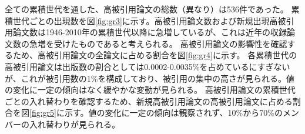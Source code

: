 全ての累積世代を通した、高被引用論文の総数（異なり）は536件であった。
累積世代ごとの出現数を図\ref{fig:gr3}に示す。高被引用論文数および新規出現高被引用論文数は1946-2010年の累積世代以降に急増しているが、これは近年の収録論文数の急増を受けたものであると考えられる。
高被引用論文の影響性を確認するため、高被引用論文の全論文に占める割合を図\ref{fig:gr4}に示す。 各累積世代の高被引用論文は出版数の割合としては0.0002-0.0035\%を占めているにすぎないが、これが被引用数の1\%を構成しており、被引用の集中の高さが見られる。値の変化に一定の傾向はなく緩やかな変動が見られる。
高被引用論文の累積世代ごとの入れ替わりを確認するため、新規高被引用論文の高被引用論文に占める割合を図\ref{fig:gr5}に示す。値の変化に一定の傾向は観察されず、10\%から70\%のメンバーの入れ替わりが見られる。
